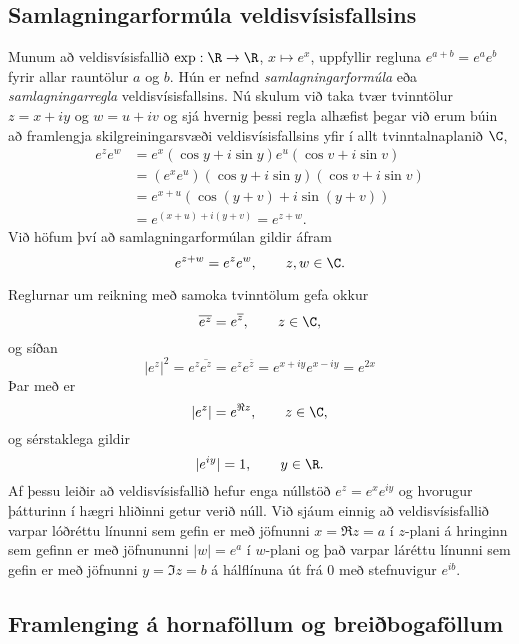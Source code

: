 \subsection*{Samlagningarformúla veldisvísisfallsins}

Munum að veldisvísisfallið $\exp: \R\to \R$,  $x\mapsto e^x$, uppfyllir
regluna $e^{a+b}=e^ae^b$ fyrir allar rauntölur $a$ og $b$.  
Hún er nefnd {\it samlagningarformúla } eða {\it samlagningarregla}
veldisvísisfallsins.
Nú  skulum við taka tvær tvinntölur $z=x+iy$ og $w=u+iv$ og sjá hvernig
þessi regla alhæfist þegar við erum búin að framlengja
skilgreiningarsvæði veldisvísisfallsins yfir í allt tvinntalnaplanið
$\C$,
\begin{align*}
e^ze^w &=e^x(\cos y+i\sin y)e^u(\cos v+i\sin v) \\
 & =(e^xe^u)(\cos y+i\sin y)(\cos v+i\sin v) \\
 & =e^{x+u}(\cos(y+v)+i\sin (y+v))\\
 & =e^{(x+u)+i(y+v)}=e^{z+w}.
\end{align*}
Við höfum því að samlagningarformúlan gildir áfram
$$
e^{z+w}=e^ze^w, \qquad z,w\in \C.
$$


Reglurnar um reikning með samoka tvinntölum gefa
okkur
$$\overline{e^z}=e^{\overline z},\qquad z\in \C,
$$
og síðan
 $$|e^z|^2=e^z\overline{e^{z}}=e^ze^{\overline z}=e^{x+iy}e^{x-iy}=e^{2x}
 $$
Þar með er
 $$|e^z|=e^{\Re z}, \qquad z\in \C,
 $$
og sérstaklega gildir 
$$
|e^{iy}|=1, \qquad y\in \R.
$$
Af þessu leiðir  að veldisvísisfallið hefur enga
núllstöð
$e^z=e^xe^{iy}$ og  hvorugur þátturinn í hægri hliðinni getur verið
núll.  Við sjáum einnig að veldisvísisfallið varpar lóðréttu línunni
sem gefin er með jöfnunni 
$x=\Re z=a$ í $z$-plani á hringinn sem gefinn er með jöfnununni 
$|w|=e^a$ í $w$-plani og það varpar
láréttu línunni sem gefin er með jöfnunni  $y=\Im z=b$ á hálflínuna
út frá $0$ með stefnuvigur $e^{ib}$.  




\subsection*{Framlenging á hornaföllum og breiðbogaföllum}

